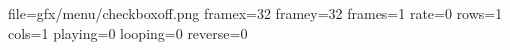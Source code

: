 file=gfx/menu/checkboxoff.png
framex=32
framey=32
frames=1
rate=0
rows=1
cols=1
playing=0
looping=0
reverse=0
